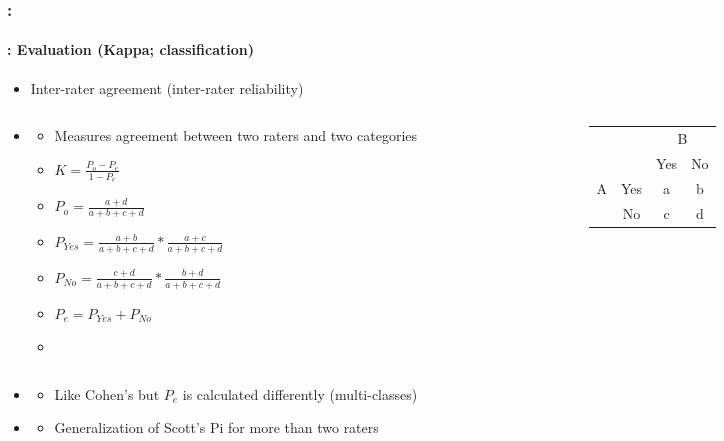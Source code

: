 \documentclass[xcolor=table]{beamer}
\begin{document}
\begin{frame}
	\frametitle{\insertshortsubtitle: \insertsection}
	\framesubtitle{\insertsubsection: Evaluation (Kappa; classification)}
	
	\begin{itemize}
		\item Inter-rater agreement (inter-rater reliability)
	\end{itemize}

\begin{columns}
\begin{column}{0.6\textwidth}
	\begin{itemize}
		\item {}
		\begin{itemize}
			\item Measures agreement between two raters and two categories
			\item $K = \frac{P_o - P_e}{1 - P_e}$
			\item $P_o = \frac{a + d}{a+b+c+d}$
			\item $P_{Yes} = \frac{a+b}{a+b+c+d} * \frac{a+c}{a+b+c+d}$
			\item $P_{No} = \frac{c+d}{a+b+c+d} * \frac{b+d}{a+b+c+d}$
			\item $P_e = P_{Yes} + P_{No}$
			\item {}
		\end{itemize}
	\end{itemize}
\end{column}
\begin{column}{0.4\textwidth}
	\begin{tabular}{|c|c|c|c|}
		\cline{3-4}
		\multicolumn{2}{c|}{}& \multicolumn{2}{c|}{B} \\
		\cline{3-4}
		\multicolumn{2}{c|}{}& Yes & No \\
		\hline
		\multirow{2}{*}{A} & Yes & a & b \\
		\cline{2-4}
		& No & c & d \\
		\hline
	\end{tabular}
\end{column}
\end{columns}

\begin{itemize}
	\item {}
	\begin{itemize}
		\item Like Cohen's but $P_e$ is calculated differently (multi-classes)
	\end{itemize}
	\item {}
	\begin{itemize}
		\item Generalization of Scott's Pi for more than two raters
	\end{itemize}
\end{itemize}

\end{frame}
\end{document}
